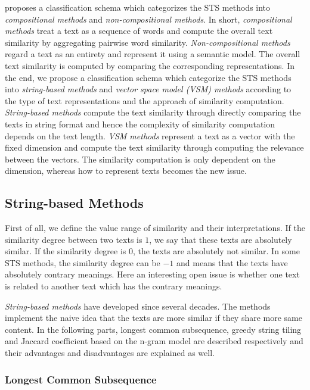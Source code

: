 \cite{bar2013composite} proposes a classification schema which categorizes the STS methods into \textit{compositional methods} and \textit{non-compositional methods}. In short, \textit{compositional methods} treat a text as a sequence of words and compute the overall text similarity by aggregating pairwise word similarity.  \textit{Non-compositional methods} regard a text as an entirety and represent it using a semantic model. The overall text similarity is computed by comparing the corresponding representations. 
In the end, we propose a classification schema which categorize the STS methods into \textit{string-based methods} and \textit{vector space model (VSM) methods} according to the type of text representations and the approach of similarity computation. \textit{String-based methods} compute the text similarity through directly comparing the texts in string format and hence the complexity of similarity computation depends on the text length. \textit{VSM methods} represent a text as a vector with the fixed dimension and compute the text similarity through computing the relevance between the vectors. The similarity computation is only dependent on the dimension, whereas how to represent texts becomes the new issue. 

\subsection{String-based Methods}
\label{sec:2.2}

First of all, we define the value range of similarity and their interpretations. If the similarity degree between two texts is $1$, we say that these texts are absolutely similar. If the similarity degree is $0$, the texts are absolutely not similar. In some STS methods, the similarity degree can be $-1$ and means that the texts have absolutely contrary meanings. Here an interesting open issue is whether one text is related to another text which has the contrary meanings. 

\textit{String-based methods} have developed since several decades. The methods implement the naive idea that the texts are more similar if they share more same content. In the following parts, longest common subsequence, greedy string tiling and Jaccard coefficient based on the n-gram model are described respectively and their advantages and disadvantages are explained as well. 

\subsubsection{Longest Common Subsequence}

